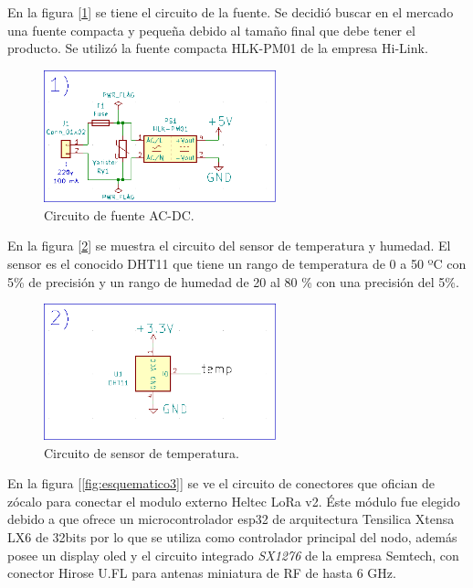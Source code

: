 En la figura [\ref{fig:esquematico1}] se tiene el circuito de la fuente. Se decidió buscar en el mercado una fuente compacta y pequeña debido al tamaño final que debe tener el producto. Se utilizó la fuente compacta HLK-PM01 de la empresa Hi-Link.

\begin{figure}[h!]
	\centering
	\includegraphics[width=0.6\textwidth]{./Figures/esquematico1.png}
	\caption{Circuito de fuente AC-DC.}
	\label{fig:esquematico1}
\end{figure}

En la figura [\ref{fig:esquematico2}] se muestra el circuito del sensor de temperatura y humedad. El sensor es el conocido DHT11 que tiene un rango de temperatura de 0 a 50 ºC con 5\% de precisión y un rango de humedad de 20 al 80 \% con una precisión del 5\%.

\begin{figure}[h!]
	\centering
	\includegraphics[width=0.6\textwidth]{./Figures/esquematico2.png}
	\caption{Circuito de sensor de temperatura.}
	\label{fig:esquematico2}
\end{figure}

En la figura [\ref{fig:esquematico3}] se ve el circuito de conectores que ofician de zócalo para conectar el modulo externo Heltec LoRa v2. Éste módulo fue elegido debido a que ofrece un microcontrolador esp32 de arquitectura Tensilica Xtensa LX6 de 32bits por lo que se utiliza como controlador principal del nodo, además posee un display oled y el circuito integrado {\textit{SX1276}} de la empresa Semtech, con conector Hirose U.FL para antenas miniatura de RF de hasta 6 GHz.


